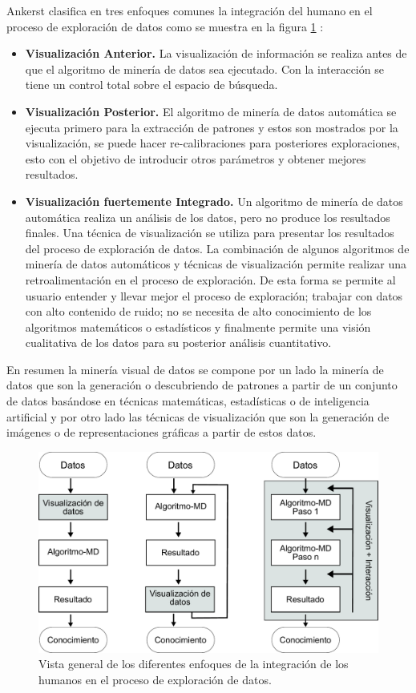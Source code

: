 Ankerst \cite{ankerst2001visual} clasifica en tres enfoques comunes la integración del humano en el proceso de exploración de datos como se muestra en la figura \ref{fig:VDM} :
\begin{itemize}
	\item \textbf{Visualización Anterior.} La visualización de información se realiza antes de que el algoritmo de minería de datos sea ejecutado. Con la interacción se tiene un control total sobre el espacio de búsqueda. 
	\item \textbf{Visualización Posterior.} El algoritmo de minería de datos automática se ejecuta primero para la extracción de patrones y estos son mostrados por la visualización, se puede hacer re-calibraciones para posteriores exploraciones, esto con el objetivo de introducir otros parámetros y obtener mejores resultados.
	\item \textbf{Visualización fuertemente Integrado.} Un algoritmo de minería de datos automática realiza un análisis de los datos, pero no produce los resultados finales. Una técnica de visualización se utiliza para presentar los resultados  del proceso de exploración de datos. La combinación de algunos algoritmos de minería de datos automáticos y técnicas de visualización permite  realizar una retroalimentación en el proceso de exploración. De esta forma se permite al usuario entender y llevar mejor el proceso de exploración; trabajar con datos con alto contenido de ruido; no se necesita de alto conocimiento de los algoritmos matemáticos o estadísticos y finalmente permite una visión cualitativa de los datos para su posterior análisis cuantitativo.
\end{itemize}

En resumen la minería visual de datos se compone por un lado la minería de datos que son la generación o descubriendo de patrones a partir de un conjunto de datos basándose en técnicas matemáticas, estadísticas o de inteligencia artificial y por otro lado las técnicas de visualización que son la generación de imágenes o de representaciones gráficas a partir de estos datos.
\begin{figure}[!h]
\centering
\includegraphics[width=\columnwidth]{figs/VDM}%
\caption{Vista general de los diferentes enfoques de la integración de los humanos en el proceso de exploración de datos.}%
\label{fig:VDM}%
\end{figure}

